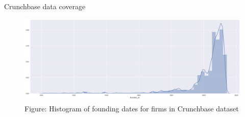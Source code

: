 \documentclass[english,usenames,dvipsnames]{beamer}
\begin{document}
\begin{frame}{Crunchbase data coverage}
\label{crunchbase_founding_dates_coverage}
\hyperlink{Data}{}
\begin{figure}
	\includegraphics[scale=0.4]{figures/crunchbase_founding_dates}
	\caption{Figure: Histogram of founding dates for firms in Crunchbase dataset}
\end{figure}
\end{frame}
\end{document}
